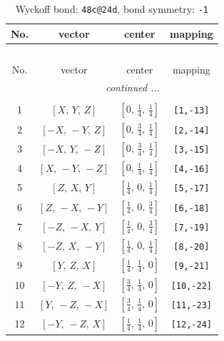 \documentclass[fleqn,8pt]{jsarticle}
\begin{document}
\begin{longtable}{cccc}
\caption{Wyckoff bond: {\tt 48c@24d}, bond symmetry: {\tt -1}}
 \\
 \hline \hline
No. & vector & center & mapping \\ \hline \endfirsthead

\multicolumn{3}{l}{\tablename\ \thetable{}} \\
 \hline \hline
No. & vector & center & mapping \\ \hline \endhead

 \hline \hline
\multicolumn{3}{r}{\footnotesize\it continued ...} \\ \endfoot

 \hline \hline
\multicolumn{3}{r}{} \\ \endlastfoot

1 & $\left[ X,\, Y,\, Z \right]$ & $\left[ 0,\, \frac{1}{4},\, \frac{1}{4} \right]$ & {\tt [1,-13]} \\ \hline
2 & $\left[ - X,\, - Y,\, Z \right]$ & $\left[ 0,\, \frac{3}{4},\, \frac{1}{4} \right]$ & {\tt [2,-14]} \\ \hline
3 & $\left[ - X,\, Y,\, - Z \right]$ & $\left[ 0,\, \frac{3}{4},\, \frac{1}{4} \right]$ & {\tt [3,-15]} \\ \hline
4 & $\left[ X,\, - Y,\, - Z \right]$ & $\left[ 0,\, \frac{1}{4},\, \frac{1}{4} \right]$ & {\tt [4,-16]} \\ \hline
5 & $\left[ Z,\, X,\, Y \right]$ & $\left[ \frac{1}{4},\, 0,\, \frac{1}{4} \right]$ & {\tt [5,-17]} \\ \hline
6 & $\left[ Z,\, - X,\, - Y \right]$ & $\left[ \frac{1}{4},\, 0,\, \frac{3}{4} \right]$ & {\tt [6,-18]} \\ \hline
7 & $\left[ - Z,\, - X,\, Y \right]$ & $\left[ \frac{1}{4},\, 0,\, \frac{3}{4} \right]$ & {\tt [7,-19]} \\ \hline
8 & $\left[ - Z,\, X,\, - Y \right]$ & $\left[ \frac{1}{4},\, 0,\, \frac{1}{4} \right]$ & {\tt [8,-20]} \\ \hline
9 & $\left[ Y,\, Z,\, X \right]$ & $\left[ \frac{1}{4},\, \frac{1}{4},\, 0 \right]$ & {\tt [9,-21]} \\ \hline
10 & $\left[ - Y,\, Z,\, - X \right]$ & $\left[ \frac{3}{4},\, \frac{1}{4},\, 0 \right]$ & {\tt [10,-22]} \\ \hline
11 & $\left[ Y,\, - Z,\, - X \right]$ & $\left[ \frac{3}{4},\, \frac{1}{4},\, 0 \right]$ & {\tt [11,-23]} \\ \hline
12 & $\left[ - Y,\, - Z,\, X \right]$ & $\left[ \frac{1}{4},\, \frac{1}{4},\, 0 \right]$ & {\tt [12,-24]} \\
\end{longtable}
\end{document}
